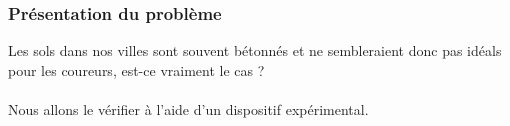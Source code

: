 \begin{frame}
\frametitle{Présentation du problème}
Les sols dans nos villes sont souvent bétonnés et ne sembleraient donc pas idéals pour les coureurs, est-ce vraiment le cas ?
\\
\\
Nous allons le vérifier à l'aide d'un dispositif expérimental.
\end{frame}
